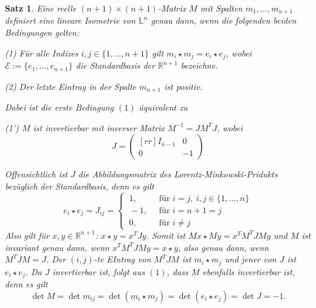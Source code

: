 \documentclass[11pt]{book}
\numberwithin{dummy}{section}
\newtheorem{theorem}{Satz}[section]
\theoremstyle{nonumberbreak}
\newenvironment{defin}[1][]{\ifthenelse{\equal{#1}{}}{\definition}{\definition[#1]}\rm}{\enddefinition}
\newenvironment{pr}[1][]{\ifthenelse{\equal{#1}{}}{\proof}{\proof[#1]}\rm}{\endproof}
\newcommand{\Loid}{\mathbb{L}}
\newcommand{\R}{\mathbb{R}}
\begin{document}
\begin{spacing}{1.4}
\begin{defin}
\begin{compactenum}
\end{compactenum}

\end{defin}


\hypertarget{satzvierfuenfdrei}{}
\begin{theorem}   %
Eine reelle $(n+1) \times (n+1)$-Matrix $M$ mit Spalten $m_1, \ldots, m_{n+1}$ definiert eine lineare Isometrie von $\Loid^n$ genau dann, wenn die folgenden beiden Bedingungen gelten:
\begin{compactenum}
\item[(1)] Für alle Indizes $i,j \in \{1, \ldots, n+1\}$ gilt $m_i \star m_j = e_i \star e_j$, wobei $\mathcal{E}:= \{e_1, \ldots, e_{n+1}\}$ die Standardbasis der $\R^{n+1}$ bezeichne.
\item[(2)] Der letzte Eintrag in der Spalte $m_{n+1}$ ist positiv.
\end{compactenum}
Dabei ist die erste Bedingung $(1)$ äquivalent zu 
\begin{compactenum}
\item[(1')] $M$ ist invertierbar mit inverser Matrix $M^{-1} = J M^{T} J$, wobei 
$$J = \begin{pmatrix}[rr] I_{n-1} & 0 \\ 0 & -1\end{pmatrix}$$
\end{compactenum}

\begin{pr}
Offensichtlich ist $J$ die Abbildungsmatrix des Lorentz-Minkowski-Pridukts bezüglich der Standardbasis, denn es gilt 
$$e_i \star e_j = J_{ij} = \begin{cases} \ 1, & \ \textrm{ für }i=j, \ i,j \in \{1, \ldots, n \} \\ \ -1, & \ \textrm{ für }i=n+1=j \\ \ 0, & \ \textrm{ für }i \neq j \end{cases} $$
Also gilt für $x,y \in \R^{n+1}$: $x \star y = x^{T} J y$. Somit ist $Mx \star My= x^{T} M^{T} J M y$ und $M$ ist invariant genau dann, wenn $x^{T}M^{T} JMy=x \star y$, also genau dann, wenn $M^{T} J M = J$. Der $(i,j)$-te EIntrag von $M^{T}JM$ ist $m_i \star m_j$ und jener von $J$ ist $e_i \star e_j$. Da $J$ invertierbar ist, folgt aus $(1)$, dass $M$ ebenfalls invertierbar ist, denn es gilt
$$\det M = \det m_{ij} = \det(m_i \star m_j) = \det (e_i \star e_j) = \det J = -1.$$
\end{pr}


\end{theorem}



\end{spacing}
\end{document}
